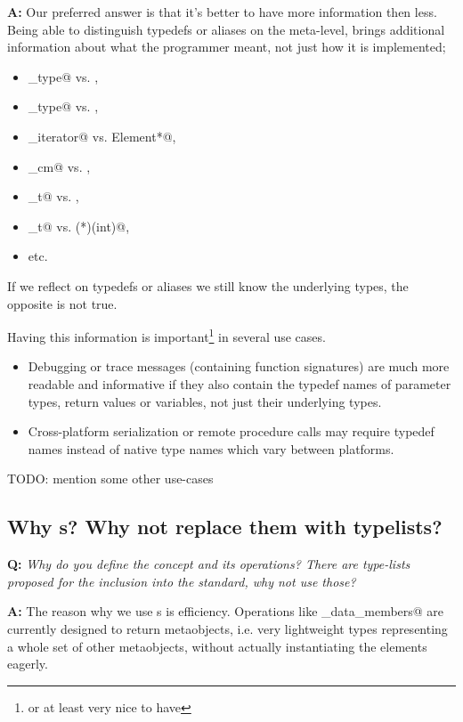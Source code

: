 \textbf{A:} Our preferred answer is that it's better to have more information
then less. Being able to distinguish typedefs or aliases on the meta-level,
brings additional information about what the programmer meant, not just how
it is implemented;
\begin{itemize}
	\item \verb@size_type@ vs. \verb@unsigned@,
	\item \verb@rank_type@ vs. \verb@short@,
	\item \verb@const_iterator@ vs. \verb@const Element*@,
	\item \verb@height_cm@ vs. \verb@float@,
	\item \verb@pid_t@ vs. \verb@int@,
	\item \verb@sighandler_t@ vs. \verb@void (*)(int)@,
	\item etc.
\end{itemize}

If we reflect on typedefs or aliases we still know the underlying types,
the opposite is not true.  

Having this information is important\footnote{or at least very nice to have}
in several use cases.

\begin{itemize}
	\item Debugging or trace messages (containing function signatures)
		are much more readable and informative if they also contain 
		the typedef names of parameter types, return values or variables,
		not just their underlying types.
	\item Cross-platform serialization or remote procedure calls may require
		typedef names instead of native type names which vary between
		platforms.
\end{itemize}

TODO: mention some other use-cases

\subsection{Why s? Why not replace them with typelists?}

\textbf{Q:} {\em Why do you define the  concept and its
operations? There are type-lists proposed for the inclusion into the standard,
why not use those?}

\textbf{A:} The reason why we use s is efficiency.
Operations like \verb@get_data_members@ are currently designed to return
metaobjects, i.e.  very lightweight types representing a whole set of
other metaobjects, without actually instantiating the elements eagerly.

